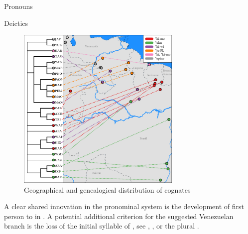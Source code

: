 \documentclass[a4paper]{article}
\begin{document}
\begin{table}[p]
	\caption{\PPar}\label{tab:ppar}
	\begin{subtable}[t]{.5\linewidth}\centering
		\caption{Pronouns}\label{tab:pparpro}
		{}
	\end{subtable}%
	\begin{subtable}[t]{.5\linewidth}\centering
		\caption{Deictics}\label{tab:ppardem}
		{}
	\end{subtable}
\end{table}

\begin{figure}[p]
	\centering
	\includegraphics[width=0.7\textwidth]{images/1+2_map.pdf}
	\caption{Geographical and genealogical distribution of  cognates}
	\label{fig:12}
\end{figure}



	
	
	
	A clear shared innovation in the pronominal system is the development of first person  to  in \PPP.
	A potential additional criterion for the suggested Venezuelan branch \parencites{gildea2004classification}{mattei2002busca}{gildea2015venezuelan} is the loss of the initial syllable of  , see \akawaio {}, \panare {}, or the \maqui plural  \parencites[85]{stegeman2014akawaio}[89]{panarepayne2013}[122]{maquiritaricaceres2011}.
	
\end{document}

